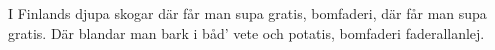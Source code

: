 


	
\beginverse*		%
I Finlands djupa skogar
där får man supa gratis,
bomfaderi,
där får man supa gratis.
Där blandar man bark
i båd' vete och potatis,
bomfaderi faderallanlej.
\endverse			%

\endsong			%
